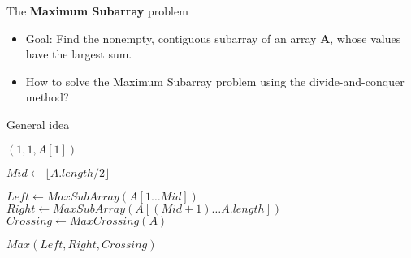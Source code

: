 \begin{frame}{The {\bf Maximum Subarray} problem}
  \begin{itemize}
    \item Goal: Find the nonempty, contiguous subarray of an
      array {\bf A}, whose values have the largest sum.
  \end{itemize} \pause
  

\end{frame}

\begin{frame}
  \begin{itemize}
    \item How to solve the Maximum Subarray problem using the {\color{blue}divide-and-conquer} method? \pause
  \end{itemize}


  \begin{block}{General idea}
    \begin{small}  
    \begin{algorithmic}
          $(1, 1, A[1])$  
       \EndIf

       \State
       
       \State $Mid \gets \lfloor A.length / 2 \rfloor$

       \State 
       \State $Left \gets MaxSubArray(A[1 \ldots Mid])$
       \State $Right \gets MaxSubArray(A[(Mid + 1) \ldots A.length])$
       \State $Crossing \gets MaxCrossing(A)$

       \State 
        $Max(Left, Right, Crossing)$
      \EndProcedure 
    \end{algorithmic}
  \end{small}  
  \end{block}

\end{frame}

